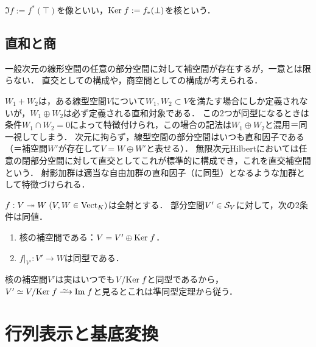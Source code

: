 \documentclass[uplatex,dvipdfmx]{jsreport}
\begin{document}
\begin{definition}
    $\Im f:=f^*(\top)$を像といい，$\Ker f:=f_*(\bot)$を核という．
\end{definition}

\subsection{直和と商}

\begin{tcolorbox}[colframe=ForestGreen, colback=ForestGreen!10!white,breakable,colbacktitle=ForestGreen!40!white,coltitle=black,fonttitle=\bfseries\sffamily,
title=]
    一般次元の線形空間の任意の部分空間に対して補空間が存在するが，一意とは限らない．
    直交としての構成や，商空間としての構成が考えられる．
\end{tcolorbox}

\begin{remarks}[直和について]
    $W_1+W_2$は，ある線型空間$V$について$W_1,W_2\subset V$を満たす場合にしか定義されないが，$W_1\oplus W_2$は必ず定義される直和対象である．
    この2つが同型になるときは条件$W_1\cap W_2=0$によって特徴付けられ，この場合の記法は$W_1\oplus W_2$と混用＝同一視してしまう．
    次元に拘らず，線型空間の部分空間はいつも直和因子である（＝補空間$W'$が存在して$V=W\oplus W'$と表せる）．
    無限次元Hilbertにおいては任意の閉部分空間に対して直交としてこれが標準的に構成でき，これを直交補空間という．
    射影加群は適当な自由加群の直和因子（に同型）となるような加群として特徴づけられる．
\end{remarks}

\begin{proposition}[準同型定理]
    $f:V\epi W\;(V,W\in\Vect_K)$は全射とする．
    部分空間$V'\in\S_V$に対して，次の2条件は同値．
    \begin{enumerate}
        \item 核の補空間である：$V=V'\oplus\Ker f$．
        \item $f|_{V'}:V'\to W$は同型である．
    \end{enumerate}
\end{proposition}
\begin{remarks}
    核の補空間$V'$は実はいつでも$V/\Ker f$と同型であるから，$V'\simeq V/\Ker f\iso \Im f$と見るとこれは準同型定理から従う．
\end{remarks}

\section{行列表示と基底変換}
\end{document}

